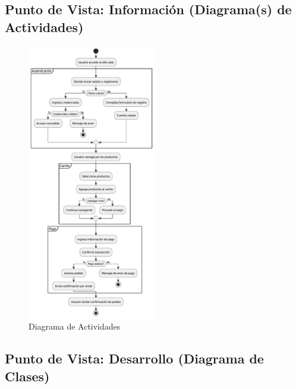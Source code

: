 \documentclass[12pt]{article}
\begin{document}
\subsection{Punto de Vista: Información (Diagrama(s) de Actividades)}
\begin{figure}[H]
    \centering
    \includegraphics[width=0.5\textwidth]{img/DiagramaActividades.pdf}
    \caption{Diagrama de Actividades}
    \label{fig:diagrama_actividades}
\end{figure}

\subsection{Punto de Vista: Desarrollo (Diagrama de Clases)}
\end{document}
